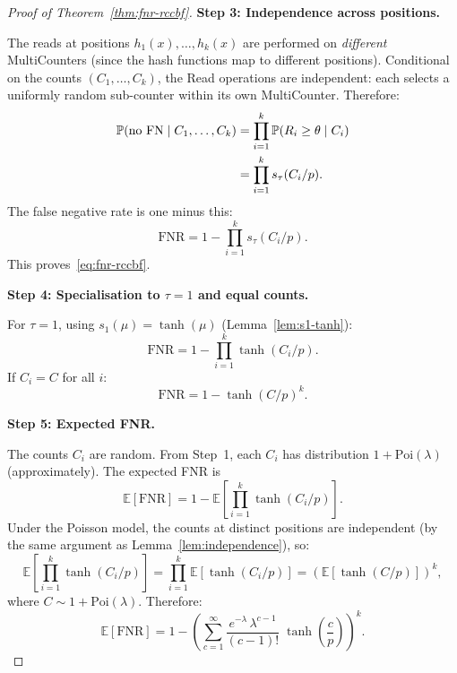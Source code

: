 \documentclass[11pt,a4paper]{article}
\newcommand{\FNR}{\mathrm{FNR}}
\newcommand{\Poi}{\mathrm{Poi}}
\newcommand{\E}{\mathbb{E}}
\newcommand{\Prob}{\mathbb{P}}
\begin{document}
\begin{proof}[Proof of Theorem~\ref{thm:fnr-rccbf}]
\medskip\noindent\textbf{Step 3: Independence across positions.}

The reads at positions $h_1(x), \ldots, h_k(x)$ are performed on
\emph{different} MultiCounters (since the hash functions map to different
positions).  Conditional on the counts $(C_1, \ldots, C_k)$, the Read
operations are independent: each selects a uniformly random sub-counter
within its own MultiCounter.  Therefore:
\begin{align}
  \Prob(\text{no FN} \mid C_1, \ldots, C_k)
  &= \prod_{i=1}^{k} \Prob(R_i \ge \theta \mid C_i) \notag \\
  &= \prod_{i=1}^{k} s_\tau(C_i/p).
  \label{eq:no-fn-product}
\end{align}
The false negative rate is one minus this:
\begin{equation}\label{eq:fnr-final}
  \FNR = 1 - \prod_{i=1}^{k} s_\tau(C_i/p).
\end{equation}
This proves~\eqref{eq:fnr-rccbf}.

\medskip\noindent\textbf{Step 4: Specialisation to $\tau = 1$ and equal counts.}

For $\tau = 1$, using $s_1(\mu) = \tanh(\mu)$
(Lemma~\ref{lem:s1-tanh}):
\begin{equation}\label{eq:fnr-tau1-proof}
  \FNR = 1 - \prod_{i=1}^{k}\tanh(C_i/p).
\end{equation}
If $C_i = C$ for all $i$:
\begin{equation}\label{eq:fnr-equal-proof}
  \FNR = 1 - \tanh(C/p)^k.
\end{equation}

\medskip\noindent\textbf{Step 5: Expected FNR.}

The counts $C_i$ are random.  From Step~1, each $C_i$ has distribution
$1 + \Poi(\lambda)$ (approximately).  The expected FNR is
\begin{equation}\label{eq:expected-fnr}
  \E[\FNR]
  = 1 - \E\!\left[\prod_{i=1}^{k}\tanh(C_i/p)\right].
\end{equation}
Under the Poisson model, the counts at distinct positions are independent
(by the same argument as Lemma~\ref{lem:independence}), so:
\begin{equation}\label{eq:expected-fnr-product}
  \E\!\left[\prod_{i=1}^{k}\tanh(C_i/p)\right]
  = \prod_{i=1}^{k} \E[\tanh(C_i/p)]
  = \left(\E[\tanh(C/p)]\right)^k,
\end{equation}
where $C \sim 1 + \Poi(\lambda)$.  Therefore:
\begin{equation}\label{eq:expected-fnr-final}
  \E[\FNR]
  = 1 - \left(\sum_{c=1}^{\infty}
        \frac{e^{-\lambda}\,\lambda^{c-1}}{(c-1)!}\;
        \tanh\!\left(\frac{c}{p}\right)\right)^{k}.
\end{equation}
\end{proof}
\end{document}
